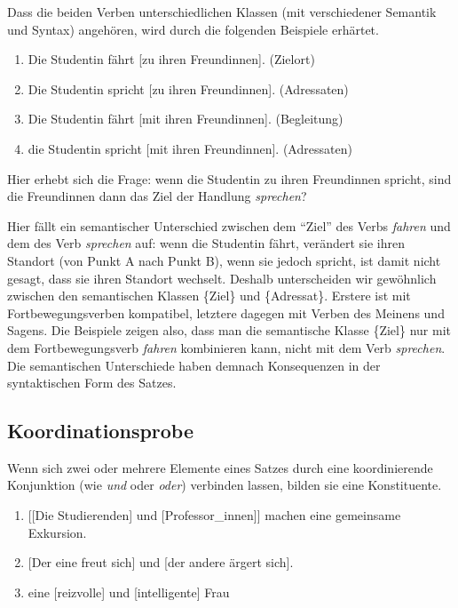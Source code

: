 \documentclass[
  letterpaper,
  DIV=11,
  numbers=noendperiod]{scrreprt}
\providecommand{\tightlist}{%
  \setlength{\itemsep}{0pt}\setlength{\parskip}{0pt}}\usepackage{longtable,booktabs,array}
\begin{document}
Dass die beiden Verben unterschiedlichen Klassen (mit verschiedener
Semantik und Syntax) angehören, wird durch die folgenden Beispiele
erhärtet.

\begin{enumerate}
\def\labelenumi{(\arabic{enumi})}
\setcounter{enumi}{6}
\tightlist
\item
  Die Studentin fährt {[}zu ihren Freundinnen{]}. (Zielort)\\
\item
  Die Studentin spricht {[}zu ihren Freundinnen{]}. (Adressaten)\\
\item
  Die Studentin fährt {[}mit ihren Freundinnen{]}. (Begleitung)\\
\item
  die Studentin spricht {[}mit ihren Freundinnen{]}. (Adressaten)
\end{enumerate}

Hier erhebt sich die Frage: wenn die Studentin zu ihren Freundinnen
spricht, sind die Freundinnen dann das Ziel der Handlung
\emph{sprechen}?

Hier fällt ein semantischer Unterschied zwischen dem ``Ziel'' des Verbs
\emph{fahren} und dem des Verb \emph{sprechen} auf: wenn die Studentin
fährt, verändert sie ihren Standort (von Punkt A nach Punkt B), wenn sie
jedoch spricht, ist damit nicht gesagt, dass sie ihren Standort
wechselt. Deshalb unterscheiden wir gewöhnlich zwischen den semantischen
Klassen \{Ziel\} und \{Adressat\}. Erstere ist mit Fortbewegungsverben
kompatibel, letztere dagegen mit Verben des Meinens und Sagens. Die
Beispiele zeigen also, dass man die semantische Klasse \{Ziel\} nur mit
dem Fortbewegungsverb \emph{fahren} kombinieren kann, nicht mit dem Verb
\emph{sprechen}. Die semantischen Unterschiede haben demnach
Konsequenzen in der syntaktischen Form des Satzes.

\hypertarget{koordinationsprobe}{%
\subsection{Koordinationsprobe}\label{koordinationsprobe}}

Wenn sich zwei oder mehrere Elemente eines Satzes durch eine
koordinierende Konjunktion (wie \emph{und} oder \emph{oder}) verbinden
lassen, bilden sie eine Konstituente.

\begin{enumerate}
\def\labelenumi{(\arabic{enumi})}
\tightlist
\item
  {[}{[}Die Studierenden{]} und {[}Professor\_innen{]}{]} machen eine
  gemeinsame Exkursion.\\
\item
  {[}Der eine freut sich{]} und {[}der andere ärgert sich{]}.\\
\item
  eine {[}reizvolle{]} und {[}intelligente{]} Frau
\end{enumerate}
\end{document}
